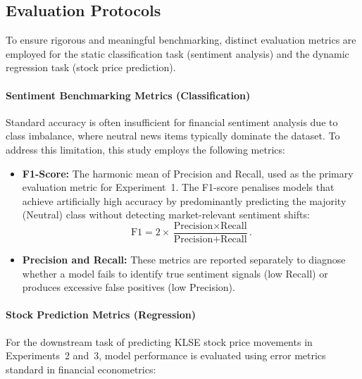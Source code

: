 \documentclass[singlespace]{ucetd}
\begin{document}
\subsection{Evaluation Protocols}

To ensure rigorous and meaningful benchmarking, distinct evaluation metrics are employed for the static classification task (sentiment analysis) and the dynamic regression task (stock price prediction).

\paragraph{Sentiment Benchmarking Metrics (Classification)}

Standard accuracy is often insufficient for financial sentiment analysis due to class imbalance, where neutral news items typically dominate the dataset. To address this limitation, this study employs the following metrics:

\begin{itemize}
    \item \textbf{F1-Score:}  
    The harmonic mean of Precision and Recall, used as the primary evaluation metric for Experiment~1. The F1-score penalises models that achieve artificially high accuracy by predominantly predicting the majority (Neutral) class without detecting market-relevant sentiment shifts:
    \[
        \text{F1} = 2 \times \frac{\text{Precision} \times \text{Recall}}{\text{Precision} + \text{Recall}}.
    \]

    \item \textbf{Precision and Recall:}  
    These metrics are reported separately to diagnose whether a model fails to identify true sentiment signals (low Recall) or produces excessive false positives (low Precision).
\end{itemize}

\paragraph{Stock Prediction Metrics (Regression)}

For the downstream task of predicting KLSE stock price movements in Experiments~2 and~3, model performance is evaluated using error metrics standard in financial econometrics:
\end{document}
